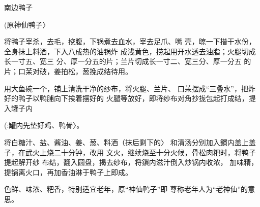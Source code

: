 \begin{recipe}{南边鸭子}

(原神仙鸭子〉

\ingredients




\cooking

\step 	将鸭子宰杀，去毛，挖腹，下锅煮去血水，宰去足爪、嘴 壳，晾一下揩干水份，全身抹上料酒，下入八成热的油锅炸 成浅黄色，捞起用开水透去油脂；火腿切成长一寸五、宽三 分、厚一分五的片；兰片切成长一寸二、宽三分、厚一分五 的片；口茉对破，姜拍松，葱挽成结待用。

\step 	用大鱼碗一个，铺上清洗干净的纱布，将火腿、兰片、 口茉摆成“三叠水”，把炸好的鸭子以鸭脯向下挨着摆好的 火腿等放好，即将纱布对角抄拢包起打成结，提入罐子内

(:罐内先垫好鸡、鸭骨〉。

\step 	将白糖汁、盐、酱油、姜、葱、料酒（抹后剩下的〉 和清汤分别加入鏆内盖上盖子，在武火上烧二十分钟，改用 文火，继续烧至十分火候，骨松肉粑时，将鸭子提起解开纱 布结，翻入圆盘，揭去纱布，将鏆内滋汁倒入炒锅内收浓， 加味精，提锅离火口，再加香油淋于鸭子上即成。

\notes

色鲜、味浓、粑香，特别适宜老年，原“神仙鸭子”即 尊称老年人为“老神仙”的意思。

\end{recipe}

